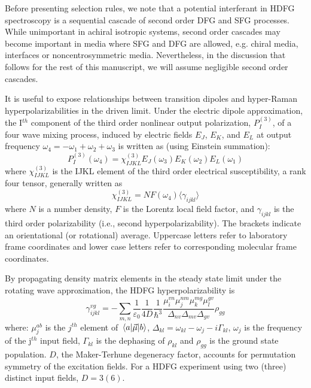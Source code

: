 \documentclass[aip, jcp, reprint, onecolumn]{revtex4-2}
\begin{document}
Before presenting selection rules, we note that a potential interferant in HDFG spectroscopy is a sequential cascade of second order DFG and SFG processes.\cite{RN301}
While unimportant in achiral isotropic systems,\cite{Belkin2000} second order cascades may become important in media where SFG and DFG are allowed, e.g. chiral media, interfaces or noncentrosymmetric media. 
Nevertheless, in the discussion that follows for the rest of this manuscript, we will assume negligible second order cascades. %

It is useful to expose relationships between transition dipoles and hyper-Raman hyperpolarizabilities in the driven limit. \cite{Simpson2004}
Under the electric dipole approximation, the I$^{th}$ component of the third order nonlinear output polarization, ${P}^{(3)}_I$, of a four wave mixing process, induced by electric fields $E_J$, $E_K$, and $E_L$ at output frequency $\omega_4=-\omega_1 + \omega_2 + \omega_3$ is written as (using Einstein summation): \cite{RN307}
\begin{equation} \label{polarization}
{P}^{(3)}_I (\omega_4)  = \chi^{(3)}_{IJKL} E_J(\omega_3) E_K(\omega_2) E_L(\omega_1) 
\end{equation}
where $\chi^{(3)}_{IJKL}$ is the IJKL element of the third order electrical susceptibility, a rank four tensor, generally written as
\begin{equation}
	\chi^{(3)}_{IJKL} = NF(\omega_4) \langle \gamma_{ijkl} \rangle
\end{equation}
where $N$ is a number density, $F$ is the Lorentz local field factor, and $\gamma_{ijkl}$ is the third order polarizability (i.e., second hyperpolarizability). 
The brackets indicate an orientational (or rotational) average.\cite{Andrews1977}
Uppercase letters refer to laboratory frame coordinates and lower case letters refer to corresponding molecular frame coordinates.

By propagating density matrix elements in the steady state limit under the rotating wave approximation, the HDFG hyperpolarizability is \cite{RN133}
\begin{equation}\label{sivegamma}
		\gamma_{ijkl}^{vg} =	- \sum_{m, n} \frac{1}{\varepsilon_0} \frac{1}{4D} \frac{1}{\hbar^3} \frac{\mu^{vn}_{i} \mu^{nm}_{j} \mu^{mg}_{k} \mu^{gv}_{l} }{\Delta_{nv} \Delta_{mv}\Delta_{gv}}  \rho_{gg}
\end{equation}
where: $\mu^{ab}_{j}$ is the $j^{th}$ element of $\mel{a}{\vec{\mu}}{b}$, $\Delta_{kl} = \omega_{kl} - \omega_{j} - i\Gamma_{kl}$, $\omega_j$ is the frequency of the j$^{th}$ input field, $\Gamma_{kl}$ is the dephasing of $\rho_{kl}$ and $\rho_{gg}$ is the ground state population.
$D$, the Maker-Terhune degeneracy factor, accounts for permutation symmetry of the excitation fields.\cite{RN134} 
For a HDFG experiment using two (three) distinct input fields, $D = 3 (6)$.
\end{document}
